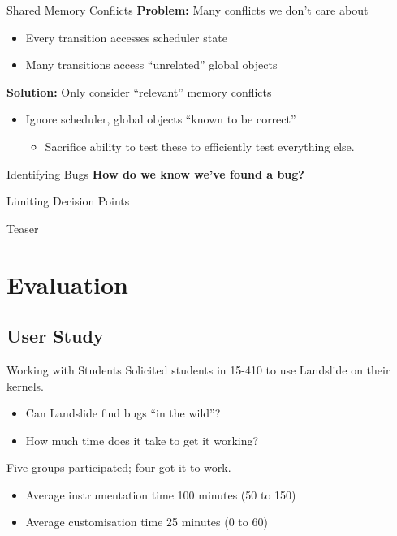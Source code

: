 \documentclass[xcolor=dvipsnames]{beamer}
\begin{document}
\begin{frame}{Shared Memory Conflicts}
	\textbf{Problem:} Many conflicts we don't care about
	\begin{itemize}
		\item Every transition accesses scheduler state
		\item Many transitions access ``unrelated'' global objects
	\end{itemize}
	\linegap

	{\bf Solution:} Only consider ``relevant'' memory conflicts
	\begin{itemize}
		\item Ignore scheduler, global objects ``known to be correct''
		\begin{itemize}
			\item Sacrifice ability to test these to efficiently test everything else.
		\end{itemize}
	\end{itemize}
\end{frame}
\begin{frame}{Identifying Bugs}
	\textbf{How do we know we've found a bug?}
\end{frame}
\begin{frame}{Limiting Decision Points}
\end{frame}
\begin{frame}{Teaser}
\end{frame}

\section{Evaluation}


\subsection{User Study}

\begin{frame}{Working with Students} %
	Solicited students in 15-410 to use Landslide on their kernels.
	\begin{itemize}
		\item Can Landslide find bugs ``in the wild''?
		\item How much time does it take to get it working?
	\end{itemize}
	\linegap

	Five groups participated; four got it to work.
	\begin{itemize}
		\item Average instrumentation time 100 minutes (50 to 150)
		\item Average customisation time 25 minutes (0 to 60)
	\end{itemize}
\end{frame}
\end{document}
